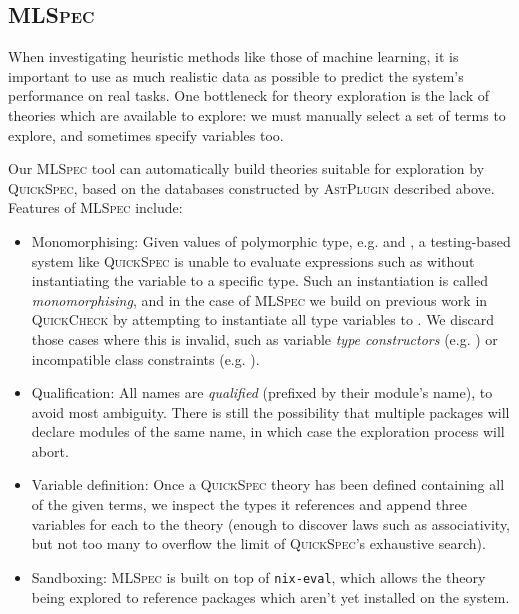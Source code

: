 \documentclass[]{article}
\begin{document}
\subsection{\textsc{MLSpec}}\label{mlspec}

When investigating heuristic methods like those of machine learning, it is important to use as much realistic data as possible to predict the system's performance on real tasks. One bottleneck for theory exploration is the lack of theories which are available to explore: we must manually select a set of terms to explore, and sometimes specify variables too.

Our \textsc{MLSpec} tool can automatically build theories suitable for exploration by \textsc{QuickSpec}, based on the databases constructed by \textsc{AstPlugin} described above. Features of \textsc{MLSpec} include:

\begin{itemize}
  \item{Monomorphising}: Given values of polymorphic type, e.g.  and , a testing-based system like \textsc{QuickSpec} is unable to evaluate expressions such as  without instantiating the variable  to a specific type. Such an instantiation is called \emph{monomorphising}, and in the case of \textsc{MLSpec} we build on previous work in \textsc{QuickCheck} by attempting to instantiate all type variables to . We discard those cases where this is invalid, such as variable \emph{type constructors} (e.g. ) or incompatible class constraints (e.g. ).

  \item{Qualification}: All names are \emph{qualified} (prefixed by their module's name), to avoid most ambiguity. There is still the possibility that multiple packages will declare modules of the same name, in which case the exploration process will abort.

  \item{Variable definition}: Once a \textsc{QuickSpec} theory has been defined containing all of the given terms, we inspect the types it references and append three variables for each to the theory (enough to discover laws such as associativity, but not too many to overflow the limit of \textsc{QuickSpec}'s exhaustive search).

  \item{Sandboxing}: \textsc{MLSpec} is built on top of \texttt{nix-eval}, which allows the theory being explored to reference packages which aren't yet installed on the system.

\end{itemize}
\end{document}

